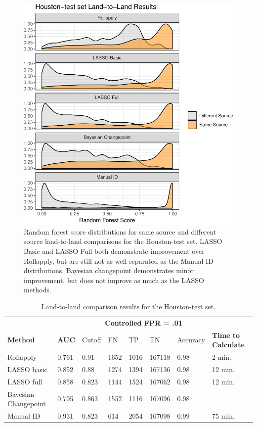 \documentclass[12pt]{article}
\begin{document}
\begin{figure}
\centering
\includegraphics{writeup_files/figure-latex/houston-groove-results-1.pdf}
\caption{\label{houston-groove-results}Random forest score distributions
for same source and different source land-to-land comparisons for the
Houston-test set. LASSO Basic and LASSO Full both demonstrate
improvement over Rollapply, but are still not as well separated as the
Manual ID distributions. Bayesian changepoint demonstrates minor
improvement, but does not improve as much as the LASSO methods.}
\end{figure}

\begin{table}[]
\centering
\begin{tabular}{llllllll}
& & \multicolumn{5}{c}{\textbf{Controlled FPR = .01}} & \\
\textbf{Method} & \textbf{AUC} & Cutoff & FN &TP & TN & Accuracy & \textbf{Time to Calculate} \\ \hline
Rollapply & 0.761 &  0.91 & 1652 & 1016&167118 & 0.98 & 2 min. \\ \hline
LASSO basic & 0.852 &  0.88 &1274 & 1394&167136 & 0.98 & 12 min. \\ \hline
LASSO full & 0.858 &  0.823 &1144 &1524 &167062 & 0.98 & 12 min. \\ \hline
Bayesian Changepoint & 0.795 &  0.863 &1552 & 1116&167096 & 0.98 & \\ \hline
Manual ID & 0.931 &  0.823 & 614& 2054&167098 & 0.99 & 75 min. \\ \hline 
\end{tabular}
\caption{Land-to-land comparison results for the Houston-test set.}
\label{houston-table}
\end{table}
\end{document}
